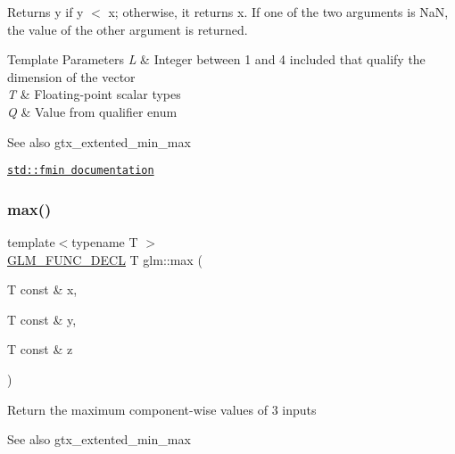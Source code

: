 Returns y if y $<$ x; otherwise, it returns x. If one of the two arguments is NaN, the value of the other argument is returned.


\begin{DoxyTemplParams}{Template Parameters}
{\em L} & Integer between 1 and 4 included that qualify the dimension of the vector \\
\hline
{\em T} & Floating-\/point scalar types \\
\hline
{\em Q} & Value from qualifier enum\\
\hline
\end{DoxyTemplParams}
\begin{DoxySeeAlso}{See also}
gtx\+\_\+extented\+\_\+min\+\_\+max 

\href{http://en.cppreference.com/w/cpp/numeric/math/fmin}{\tt std\+::fmin documentation} 
\end{DoxySeeAlso}
\mbox{\label{group__gtx__extended__min__max_ga04991ccb9865c4c4e58488cfb209ce69}} 
\subsubsection{\texorpdfstring{max()}{max()}\hspace{0.1cm}{\footnotesize\ttfamily [1/6]}}
{\footnotesize\ttfamily template$<$typename T $>$ \\
\hyperlink{setup_8hpp_ab2d052de21a70539923e9bcbf6e83a51}{G\+L\+M\+\_\+\+F\+U\+N\+C\+\_\+\+D\+E\+CL} T glm\+::max (\begin{DoxyParamCaption}\item[{T const \&}]{x,  }\item[{T const \&}]{y,  }\item[{T const \&}]{z }\end{DoxyParamCaption})}

Return the maximum component-\/wise values of 3 inputs \begin{DoxySeeAlso}{See also}
gtx\+\_\+extented\+\_\+min\+\_\+max 
\end{DoxySeeAlso}
\mbox{\label{group__gtx__extended__min__max_gae1b7bbe5c91de4924835ea3e14530744}} 
